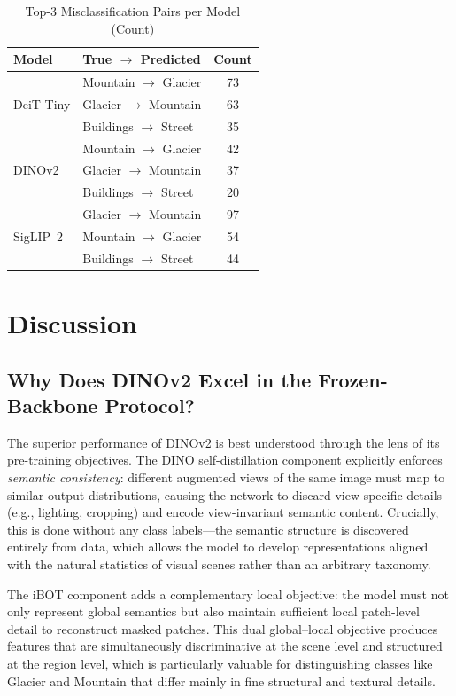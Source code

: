 \documentclass[journal]{IEEEtran}
\begin{document}
\begin{table}[!t]
\renewcommand{\arraystretch}{1.3}
\caption{Top-3 Misclassification Pairs per Model (Count)}
\label{tab:confusion_key}
\centering
\begin{tabular}{llc}
\toprule
\textbf{Model} & \textbf{True $\to$ Predicted} & \textbf{Count} \\
\midrule
\multirow{3}{*}{DeiT-Tiny}
    & Mountain $\to$ Glacier   & 73 \\
    & Glacier $\to$ Mountain   & 63 \\
    & Buildings $\to$ Street   & 35 \\
\midrule
\multirow{3}{*}{DINOv2}
    & Mountain $\to$ Glacier   & 42 \\
    & Glacier $\to$ Mountain   & 37 \\
    & Buildings $\to$ Street   & 20 \\
\midrule
\multirow{3}{*}{SigLIP~2}
    & Glacier $\to$ Mountain   & 97 \\
    & Mountain $\to$ Glacier   & 54 \\
    & Buildings $\to$ Street   & 44 \\
\bottomrule
\end{tabular}
\end{table}

\section{Discussion}
\label{sec:discussion}

\subsection{Why Does DINOv2 Excel in the Frozen-Backbone Protocol?}
The superior performance of DINOv2 is best understood through the lens of its
pre-training objectives. The DINO self-distillation component explicitly enforces
\textit{semantic consistency}: different augmented views of the same image must map
to similar output distributions, causing the network to discard view-specific details
(e.g., lighting, cropping) and encode view-invariant semantic content.
Crucially, this is done without any class labels—the semantic structure is discovered
entirely from data, which allows the model to develop representations aligned with
the natural statistics of visual scenes rather than an arbitrary taxonomy.

The iBOT component adds a complementary local objective: the model must not only
represent global semantics but also maintain sufficient local patch-level detail to
reconstruct masked patches. This dual global–local objective produces features that
are simultaneously discriminative at the scene level and structured at the region level,
which is particularly valuable for distinguishing classes like Glacier and Mountain
that differ mainly in fine structural and textural details.
\end{document}

